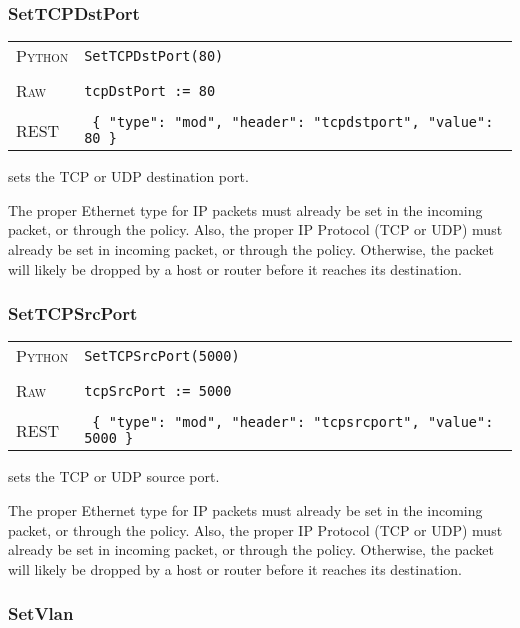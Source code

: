 \subsubsection{SetTCPDstPort}

\bigskip
\begin{tabularx}{\linewidth}{lX}
\textsc{Python}   & \texttt{SetTCPDstPort(80)} \\ \\
\textsc{Raw}    & \texttt{tcpDstPort := 80}     \\ \\
\textsc{REST} & \texttt{ \{ "type": "mod", "header": "tcpdstport", "value": 80 \} }
\end{tabularx}

 sets the TCP or UDP destination port.      

The proper Ethernet type for IP packets must already be set in the incoming packet, or through the 
 policy.  
Also, the proper IP Protocol (TCP or UDP) must already be set in incoming packet, or through the 
 policy.  
Otherwise, the packet will likely be dropped by a host or router before it 
reaches its destination.

\subsubsection{SetTCPSrcPort}

\bigskip
\begin{tabularx}{\linewidth}{lX}
\textsc{Python}   & \texttt{SetTCPSrcPort(5000)} \\ \\
\textsc{Raw}    & \texttt{tcpSrcPort := 5000}     \\ \\
\textsc{REST} & \texttt{ \{ "type": "mod", "header": "tcpsrcport", "value": 5000 \} }
\end{tabularx}

 sets the TCP or UDP source port.      

The proper Ethernet type for IP packets must already be set in the incoming packet, or through the 
 policy.  
Also, the proper IP Protocol (TCP or UDP) must already be set in incoming packet, or through the 
 policy.  
Otherwise, the packet will likely be dropped by a host or router before it 
reaches its destination.

\subsubsection{SetVlan}

